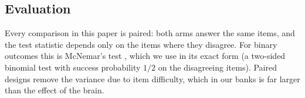 \subsection{Evaluation}
Every comparison in this paper is paired: both arms answer the same items, and the test statistic depends only on the items where they disagree. For binary outcomes this is McNemar's test \cite{McNemar1947}, which we use in its exact form (a two-sided binomial test with success probability $1/2$ on the disagreeing items). Paired designs remove the variance due to item difficulty, which in our banks is far larger than the effect of the brain.
